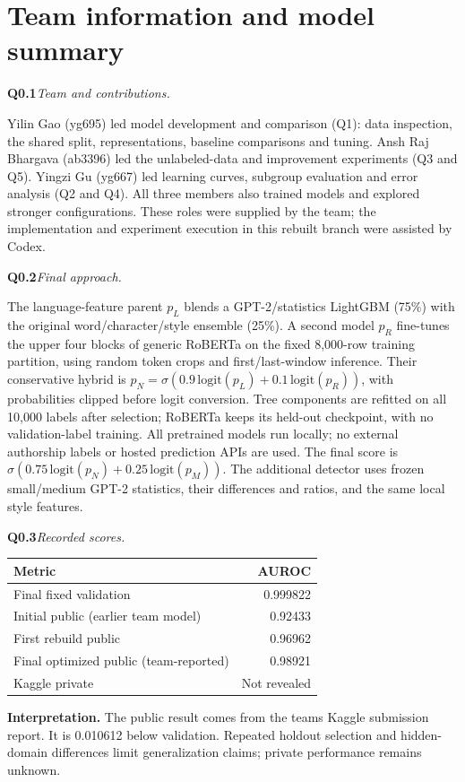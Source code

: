 \documentclass[10pt,letterpaper]{article}
\newcommand{\q}[2]{\needspace{4\baselineskip}\par\addvspace{7pt}\textbf{#1}\quad\textit{#2}\par\nobreak}
\begin{document}
\section*{Team information and model summary}
\q{Q0.1}{Team and contributions.}Yilin Gao (yg695) led model development and comparison (Q1): data inspection, the shared split, representations, baseline comparisons and tuning. Ansh Raj Bhargava (ab3396) led the unlabeled-data and improvement experiments (Q3 and Q5). Yingzi Gu (yg667) led learning curves, subgroup evaluation and error analysis (Q2 and Q4). All three members also trained models and explored stronger configurations. These roles were supplied by the team; the implementation and experiment execution in this rebuilt branch were assisted by Codex.
\q{Q0.2}{Final approach.}
The language-feature parent $p_L$ blends a GPT-2/statistics LightGBM (75\%) with the original word/character/style ensemble (25\%).
A second model $p_R$ fine-tunes the upper four blocks of generic RoBERTa on the fixed 8,000-row training partition, using random token crops and first/last-window inference.
Their conservative hybrid is $p_N=\sigma(0.9\,\mathrm{logit}(p_L)+0.1\,\mathrm{logit}(p_R))$, with probabilities clipped before logit conversion.
Tree components are refitted on all 10,000 labels after selection; RoBERTa keeps its held-out checkpoint, with no validation-label training.
All pretrained models run locally; no external authorship labels or hosted prediction APIs are used.
The final score is $\sigma(0.75\,\mathrm{logit}(p_N)+0.25\,\mathrm{logit}(p_M))$. The additional detector uses frozen small/medium GPT-2 statistics, their differences and ratios, and the same local style features.
\q{Q0.3}{Recorded scores.}
\par\noindent
\begin{tabularx}{\linewidth}{@{}Yr@{}}
\toprule
Metric & AUROC \\ \midrule
Final fixed validation & 0.999822 \\
Initial public (earlier team model) & 0.92433 \\
First rebuild public & 0.96962 \\
Final optimized public (team-reported) & 0.98921 \\
Kaggle private & Not revealed \\
\bottomrule
\end{tabularx}

\par
\textbf{Interpretation.} The public result comes from the team\textquotesingle s Kaggle submission report. It is 0.010612 below validation. Repeated holdout selection and hidden-domain differences limit generalization claims; private performance remains unknown.
\newpage
\end{document}
